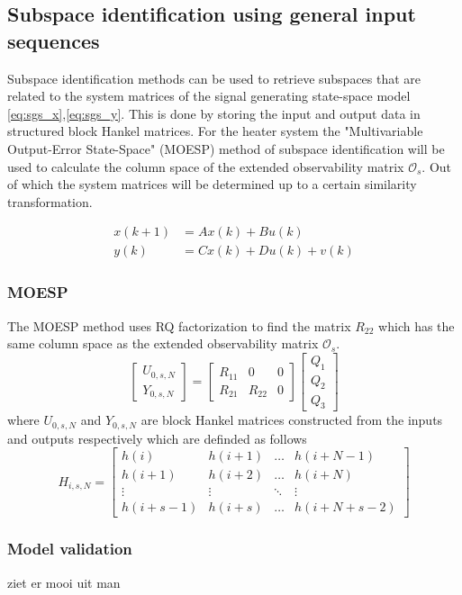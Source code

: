 \subsection{Subspace identification using general input sequences}
Subspace identification methods can be used to retrieve subspaces that are related to the system matrices of the signal generating state-space model \ref{eq:sgs_x},\ref{eq:sgs_y}. This is done by storing the input and output data in structured block Hankel matrices. For the heater system the "Multivariable Output-Error State-Space" (MOESP) method \cite[p.~301--312]{FilteringIdentification} of subspace identification will be used to calculate the column space of the extended observability matrix $\mathcal{O}_s$. Out of which the system matrices will be determined up to a certain similarity transformation. 

\begin{align}
    x(k+1) &= Ax(k) + Bu(k) \label{eq:sgs_x}\\
    y(k) &= Cx(k) + Du(k) + v(k) \label{eq:sgs_y}
\end{align}

\subsubsection{MOESP}
The MOESP method uses RQ factorization to find the matrix $R_{22}$ which has the same column space as the extended observability matrix $\mathcal{O}_s$. 
$$
\left[\begin{array}{c}
U_{0, s, N} \\
Y_{0, s, N}
\end{array}\right]=\left[\begin{array}{ccc}
R_{11} & 0 & 0 \\
R_{21} & R_{22} & 0
\end{array}\right]\left[\begin{array}{c}
Q_{1} \\
Q_{2} \\
Q_{3}
\end{array}\right]
$$
where $U_{0,s,N}$ and $Y_{0,s,N}$ are block Hankel matrices constructed from the inputs and outputs respectively which are definded as follows
$$
H_{i, s, N}=\left[\begin{array}{cccc}
h(i) & h(i+1) & \dots & h(i+N-1) \\
h(i+1) & h(i+2) & \dots & h(i+N) \\
\vdots & \vdots & \ddots & \vdots \\
h(i+s-1) & h(i+s) & \dots & h(i+N+s-2)
\end{array}\right]
$$


\subsubsection{Model validation}
ziet er mooi uit man